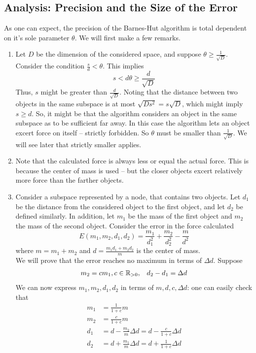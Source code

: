 \subsection{Analysis: Precision and the Size of the Error}
As one can expect, the precision of the Barnes-Hut algorithm is total dependent on it's sole parameter $\theta$. We will first make a few remarks.
\begin{enumerate}
\item Let $D$ be the dimension of the considered space, and suppose $\theta \geq \frac{1}{\sqrt{D}}$. Consider the condition $\frac{s}{d} < \theta$. This implies
\[
s < d\theta \geq \frac{d}{\sqrt{D}}
\]
Thus, $s$ might be greater than $\frac{d}{\sqrt{D}}$. Noting that the distance between two objects in the same subspace is at most $\sqrt{Ds^2} = s\sqrt{D}$, which might imply $s\geq d$. So, it might be that the algorithm considers an object in the same subspace as to be sufficient far away. In this case the algorithm lets an object excert force on itself -- strictly forbidden. So $\theta$ must be smaller than $\frac{1}{\sqrt{D}}$. We will see later that strictly smaller applies.
\item Note that the calculated force is always less or equal the actual force. This is because the center of mass is used -- but the closer objects excert relatively more force than the farther objects.
\item Consider a subspace represented by a node, that contains two objects. Let $d_1$ be the distance from the considered object to the first object, and let $d_2$ be defined similarly. In addition, let $m_1$ be the mass of the first object and $m_2$ the mass of the second object. Consider the error in the force calculated
\[
E(m_1,m_2,d_1,d_2) = \frac{m_1}{d_1^2}+\frac{m_2}{d_2^2}-\frac{m}{d^2}
\]
where $m = m_1+m_2$ and $d = \frac{m_1d_1+m_2d_2}{m}$ is the center of mass.\\
We will prove that the error reaches no maximum in terms of $\Delta d$. Suppose
\[
\begin{array}{cc}
m_2 = cm_1, c\in \mathbb{R}_{>0}, & d_2-d_1 = \Delta d
\end{array}
\]
We can now express $m_1,m_2,d_1,d_2$ in terms of $m,d,c,\Delta d$: one can easily check that
\begin{align*}
m_1 &= \frac{1}{1+c}m\\
m_2 &= \frac{c}{1+c}m\\
d_1 &= d-\frac{m_2}{m}\Delta d = d-\frac{c}{1+c}\Delta d\\
d_2 &= d+\frac{m_1}{m}\Delta d = d+\frac{1}{1+c}\Delta d

\end{align*}
\end{enumerate}
